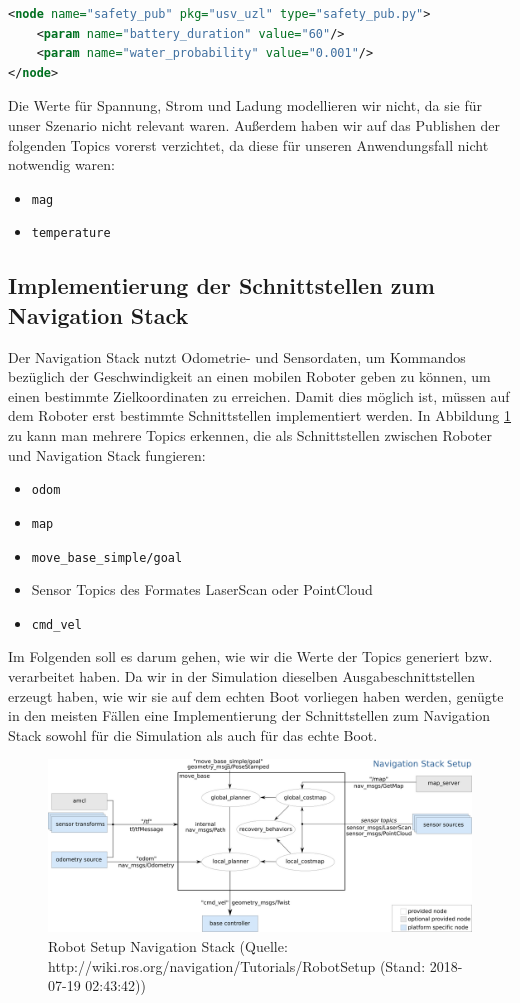 \documentclass[11pt]{article}
\begin{document}
\begin{lstlisting}[language=xml]
<node name="safety_pub" pkg="usv_uzl" type="safety_pub.py">
    <param name="battery_duration" value="60"/>
    <param name="water_probability" value="0.001"/>
</node>
\end{lstlisting}

Die Werte für Spannung, Strom und Ladung modellieren wir nicht, da sie für unser Szenario nicht relevant waren.
Außerdem haben wir auf das Publishen der folgenden Topics vorerst verzichtet, da diese für unseren Anwendungsfall nicht notwendig waren:
\begin{itemize}
	\item \texttt{mag}
	\item \texttt{temperature}
\end{itemize}

\subsection{Implementierung der Schnittstellen zum Navigation Stack}
Der Navigation Stack nutzt Odometrie- und Sensordaten, um Kommandos bezüglich der Geschwindigkeit an einen mobilen Roboter geben zu können, um einen bestimmte Zielkoordinaten zu erreichen. Damit dies möglich ist, müssen auf dem Roboter erst bestimmte Schnittstellen implementiert werden\cite{NavWiki}. In Abbildung \ref{nav} zu kann man mehrere Topics erkennen, die als Schnittstellen zwischen Roboter und Navigation Stack fungieren:
\begin{itemize}
	\item \texttt{odom}
	\item \texttt{map}
	\item \texttt{move\_base\_simple/goal}
	\item Sensor Topics des Formates LaserScan oder PointCloud
	\item \texttt{cmd\_vel}
\end{itemize}
Im Folgenden soll es darum gehen, wie wir die Werte der Topics generiert bzw. verarbeitet haben. Da wir in der Simulation dieselben Ausgabeschnittstellen erzeugt haben, wie wir sie auf dem echten Boot vorliegen haben werden, genügte in den meisten Fällen eine Implementierung der Schnittstellen zum Navigation Stack sowohl für die Simulation als auch für das echte Boot.

\begin{figure}
	\includegraphics[width=\linewidth]{overview_tf.png}
	\caption{Robot Setup Navigation Stack (Quelle: http://wiki.ros.org/navigation/Tutorials/RobotSetup (Stand: 2018-07-19 02:43:42))}
	\label{nav}
\end{figure}
\end{document}
